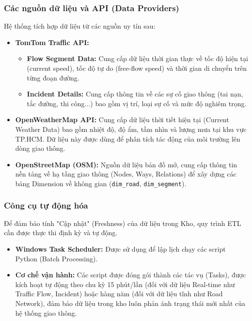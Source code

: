 \subsubsection{Các nguồn dữ liệu và API (Data Providers)}

Hệ thống tích hợp dữ liệu từ các nguồn uy tín sau:
\begin{itemize}
    \item \textbf{TomTom Traffic API:}
    \begin{itemize}
        \item \textbf{Flow Segment Data:} Cung cấp dữ liệu thời gian thực về tốc độ hiện tại (current speed), tốc độ tự do (free-flow speed) và thời gian di chuyển trên từng đoạn đường.
        \item \textbf{Incident Details:} Cung cấp thông tin về các sự cố giao thông (tai nạn, tắc đường, thi công...) bao gồm vị trí, loại sự cố và mức độ nghiêm trọng.
    \end{itemize}
    \item \textbf{OpenWeatherMap API:} Cung cấp dữ liệu thời tiết hiện tại (Current Weather Data) bao gồm nhiệt độ, độ ẩm, tầm nhìn và lượng mưa tại khu vực TP.HCM. Dữ liệu này được dùng để phân tích tác động của môi trường lên dòng giao thông.
    \item \textbf{OpenStreetMap (OSM):} Nguồn dữ liệu bản đồ mở, cung cấp thông tin nền tảng về hạ tầng giao thông (Nodes, Ways, Relations) để xây dựng các bảng Dimension về không gian (\texttt{dim\_road}, \texttt{dim\_segment}).
\end{itemize}

\subsubsection{Công cụ tự động hóa}

Để đảm bảo tính "Cập nhật" (Freshness) của dữ liệu trong Kho, quy trình ETL cần được thực thi định kỳ và tự động.
\begin{itemize}
    \item \textbf{Windows Task Scheduler:} Được sử dụng để lập lịch chạy các script Python (Batch Processing).
    \item \textbf{Cơ chế vận hành:} Các script được đóng gói thành các tác vụ (Tasks), được kích hoạt tự động theo chu kỳ 15 phút/lần (đối với dữ liệu Real-time như Traffic Flow, Incident) hoặc hàng năm (đối với dữ liệu tĩnh như Road Network), đảm bảo dữ liệu trong kho luôn phản ánh trạng thái mới nhất của hệ thống giao thông.
\end{itemize}

